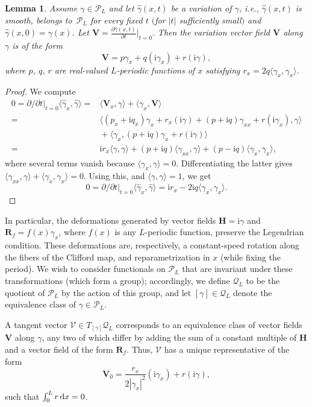 \documentclass[10pt,a4paper]{amsart}
\newcommand\Leg{ {\mathcal P}} %
\newcommand\Legq{\mathcal Q}
\def\ri{\mathrm{i}}
\newcommand\VV{\mathbf V}
\newcommand\VR{\mathbf R}
\newcommand\VH{\mathbf H}
\newcommand\qV{\mathcal V}%
\newcommand{\dx}{\,{\rm d}x}
\def\gam{\gamma} %
\def\di{\partial}
\newcommand\gamf{\widehat{\gam}} %
\newcommand\bert{\big\vert}
\numberwithin{equation}{section}
\newtheorem{Lemma}[Theorem]{Lemma}
\begin{document}
\begin{Lemma}\label{tanque}
Assume $\gam \in \Leg_L$ and let $\gamf(x,t)$ be a variation of $\gam$, i.e., $\gamf(x,t)$ is smooth, belongs to~$\Leg_L$ for every fixed $t$ $($for $|t|$ sufficiently small$)$ and $\gamf(x,0)=\gam(x)$. Let
$\VV = \frac{\partial \gamf(x,t)}{\partial t}\Big|_{t=0}.$
Then the variation vector field $\VV$ along $\gam$ is of the form
\[\VV = p\gam_x + q (\ri\gam_x) + r (\ri \gam),\]
where $p$, $q$, $r$ are real-valued $L$-periodic functions of $x$ satisfying $r_x = 2q \langle\gam_x, \gam_x\rangle.$
\end{Lemma}
\begin{proof}
We compute
\begin{align*}
0=\di/\di{t}\bert_{t=0} \bigl\langle \gamf_x, \gamf \bigr\rangle={}& \langle \VV_x, \gam\rangle + \langle \gam_x, \VV \rangle \\
={}& \langle (p_x+\ri q_x) \gam_x + r_x (\ri \gam) + (p+\ri q)\gam_{xx} + r (\ri \gam_x), \gam\rangle \\
&{}+ \langle \gam_x, (p+\ri q) \gam_x +r(\ri \gam)\rangle\\
={}& \ri r_x \langle \gam,\gam\rangle + (p+\ri q) \langle \gam_{xx}, \gam\rangle + (p-\ri q) \langle \gam_x, \gam_x\rangle,
\end{align*}
where several terms vanish because $\langle \gam_x, \gam \rangle= 0$. Differentiating the latter gives
$\langle \gam_{xx}, \gam\rangle + \langle \gam_x, \gam_x\rangle=0$. Using this, and $\langle \gam, \gam \rangle=1$, we get
\[
0=\di/\di{t}\bert_{t=0} \bigl\langle \gamf_x, \gamf \bigr\rangle = \ri r_x -2\ri q \langle \gam_x, \gam_x \rangle.
\tag*{\qed}
\]
\renewcommand{\qed}{}
\end{proof}

In particular, the deformations generated by vector fields
$\VH = \ri \gam$ and $\VR_f = f(x) \gam_x$, where $f(x)$ is any $L$-periodic function, preserve the Legendrian condition. These deformations are, respectively, a constant-speed rotation along the fibers of the Clifford map, and reparametrization in $x$ (while fixing the period). We wish to consider functionals on $\Leg_L$ that
are invariant under these transformations (which form a group); accordingly, we define $\Legq_L$ to be the quotient of $\Leg_L$ by the action of this group,
and let $[\gam] \in \Legq_L$ denote the equivalence class of $\gam \in \Leg_L$.

A tangent vector $\qV \in T_{[\gamma]} \Legq_L$ corresponds to an equivalence
class of vector fields $\VV$ along $\gam$, any two of which differ by adding the sum of a constant multiple of $\VH$ and a vector field of the form $\VR_f$.
Thus,
$\qV$
has a unique representative of the form
\[\VV_0 =\dfrac{r_x}{2|\gam_x|^2} (\ri \gam_x) + r (\ri \gam), \]
such that $\int_0^L r\dx =0$.
\end{document}
